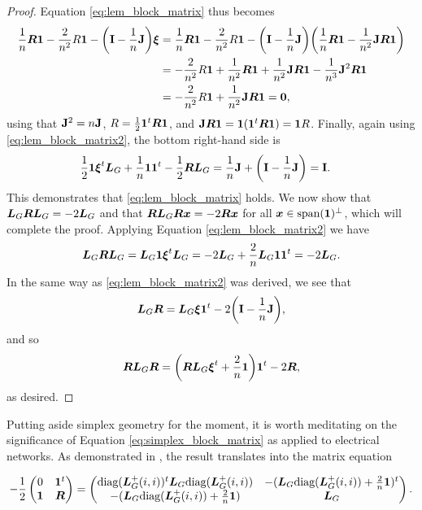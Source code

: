 \begin{proof}
Equation \eqref{eq:lem_block_matrix} thus becomes 
\begin{align*}
\frac{1}{n}\vb*{R}\vb{1} -\frac{2}{n^2}R \vb{1} - \bigg(\vb{I}-\frac{1}{n}\vb{J}\bigg)\vb*{\xi} &= \frac{1}{n}\vb*{R}\vb{1} - \frac{2}{n^2}R\vb{1} - \bigg(\vb{I}-\frac{1}{n}\vb{J}\bigg)\bigg(\frac{1}{n}\vb*{R}\vb{1} - \frac{1}{n^2}\vb{J}\vb*{R}\vb{1}\bigg) \\
&= -\frac{2}{n^2} R\vb{1} + \frac{1}{n^2}\vb*{R}\vb{1} + \frac{1}{n^2}\vb{J}\vb*{R}\vb{1} - \frac{1}{n^3}\vb{J}^2\vb*{R}\vb{1} \\
&= -\frac{2}{n^2} R\vb{1} +\frac{1}{n^2} \vb{J}\vb*{R}\vb{1} = \vb{0},
\end{align*}
using that $\vb{J}^2 = n \vb{J}$, $R=\frac{1}{2}\vb{1}^t \vb*{R}\vb{1}$, and $\vb{J}\vb*{R}\vb{1} = \vb{1}(\vb{1}^t \vb*{R}\vb{1}) = \vb{1} R$. Finally, again using \eqref{eq:lem_block_matrix2}, the bottom right-hand side is 
\begin{align*}
\frac{1}{2}\vb{1} \vb*{\xi}^t \vb*{L}_G + \frac{1}{n}\vb{1}\vb{1}^t - \frac{1}{2}\vb*{R}\vb*{L}_G &= \frac{1}{n}\vb{J} + \bigg(\vb{I}-\frac{1}{n}\vb{J}\bigg) = \vb{I}.
\end{align*}
This demonstrates that \eqref{eq:lem_block_matrix} holds. We now show that $\vb*{L}_G \vb*{R}\vb*{L}_G = -2 \vb*{L}_G$ and that $\vb*{R}\vb*{L}_G\vb*{R}\vb*{x} = -2\vb*{R}\vb*{x}$ for all $\vb*{x}\in\textnormal{span}(\vb{1})^\perp$, which will complete the proof. Applying Equation \eqref{eq:lem_block_matrix2} we have 
\begin{align*}
\vb*{L}_G\vb*{R}\vb*{L}_G = \vb*{L}_G\vb{1} \vb*{\xi}^t\vb*{L}_G = -2\vb*{L}_G+ \frac{2}{n}\vb*{L}_G\vb{1}\vb{1}^t = -2\vb*{L}_G.
\end{align*}
In the same way as \eqref{eq:lem_block_matrix2} was derived, we see that 
\begin{equation*}
\vb*{L}_G\vb*{R} = \vb*{L}_G\vb*{\xi}\vb{1}^t - 2\bigg(\vb{I}-\frac{1}{n}\vb{J}\bigg),
\end{equation*}
and so 
\begin{equation*}
\vb*{R}\vb*{L}_G\vb*{R}= \bigg(\vb*{R}\vb*{L}_G\vb*{\xi}^t + \frac{2}{n}\vb{1} \bigg)\vb{1}^t -2\vb*{R},
\end{equation*}
as desired. 
\end{proof}

Putting aside simplex geometry for the moment, it is worth meditating on the significance of Equation \eqref{eq:simplex_block_matrix} as applied to electrical networks. As demonstrated in \cite{van2017pseudoinverse}, the result translates into the matrix equation 

\begin{equation*}
-\frac{1}{2}\begin{pmatrix}
0 & \vb{1}^t \\
\vb{1} & \vb*{R}
\end{pmatrix} = 
\begin{pmatrix}
\text{diag}(\vb*{L}_G^+(i,i))^t  \vb*{L}_G \text{diag}(\vb*{L}_G^+(i,i)) 
&  -(\vb*{L}_G\text{diag}(\vb*{L}_G^+(i,i)) + \frac{2}{n}\vb{1} )^t \\
-(\vb*{L}_G\text{diag}(\vb*{L}_G^+(i,i)) + \frac{2}{n}\vb{1} ) 
& \vb*{L}_G
\end{pmatrix}.
\end{equation*}

